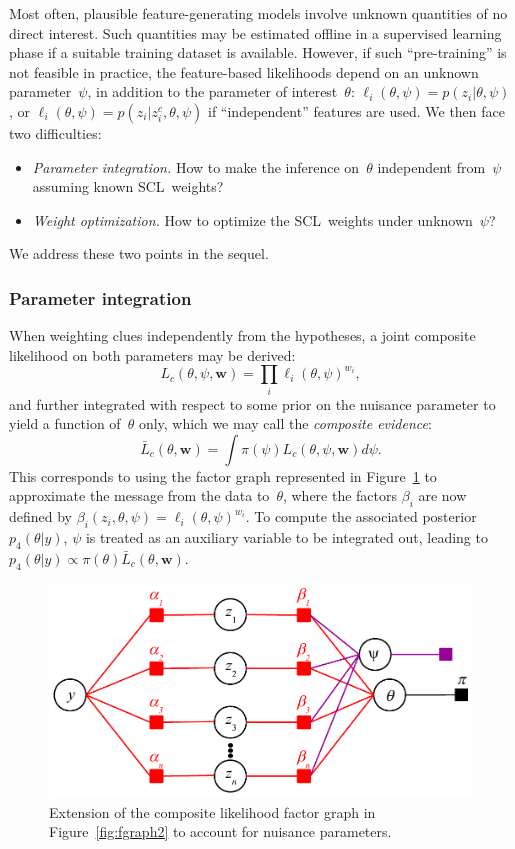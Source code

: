 \documentclass[english]{scrartcl}
\begin{document}
Most often, plausible feature-generating models involve unknown quantities of no direct interest. Such quantities may be estimated offline in a supervised learning phase if a suitable training dataset is available. However, if such ``pre-training'' is not feasible in practice, the feature-based likelihoods depend on an unknown parameter~$\psi$, in addition to the parameter of interest~$\theta$:  $\ell_i(\theta,\psi)=p(z_i|\theta,\psi)$, or $\ell_i(\theta,\psi)=p(z_i|z^c_i,\theta,\psi)$ if ``independent'' features are used. We then face two difficulties: 
\begin{itemize}
\item {\em Parameter integration.} How to make the inference on~$\theta$ independent from~$\psi$ assuming known SCL~weights?
\item {\em Weight optimization.} How to optimize the SCL~weights under unknown~$\psi$?
\end{itemize}

We address these two points in the sequel.


\subsubsection{Parameter integration}
\label{sec:nuisance_integration}

When weighting clues independently from the hypotheses, a joint composite likelihood on both parameters may be derived:
$$
L_c(\theta,\psi,\mathbf{w}) = \prod_i \ell_i(\theta,\psi)^{w_i},
$$
and further integrated with respect to some prior on the nuisance parameter to yield a function of~$\theta$ only, which we may call the {\em composite evidence}:
\begin{equation}
\label{eq:comp_evidence}
\bar{L}_c(\theta, \mathbf{w}) = \int \pi(\psi) L_c(\theta,\psi,\mathbf{w}) d\psi
.
\end{equation}
This corresponds to using the factor graph represented in Figure~\ref{fig:fgraph5} to approximate the message from the data to~$\theta$, where the factors $\beta_i$ are now defined by $\beta_i(z_i,\theta,\psi)=\ell_i(\theta,\psi)^{w_i}$. To compute the associated posterior $p_4(\theta|y)$, $\psi$ is treated as an auxiliary variable to be integrated out, leading to $p_4(\theta|y)\propto \pi(\theta)\bar{L}_c(\theta, \mathbf{w})$.

\begin{figure}[!ht]
  \begin{center}
    \includegraphics[width=.6\textwidth]{fgraph5.pdf}
  \end{center}
\caption{Extension of the composite likelihood factor graph in Figure~\ref{fig:fgraph2} to account for nuisance parameters.}
\label{fig:fgraph5}
\end{figure}
\end{document}
